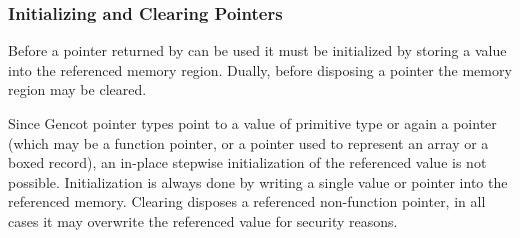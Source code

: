 \subsubsection{Initializing and Clearing Pointers}

Before a pointer returned by  can be used it must be initialized by storing a value into the referenced memory region.
Dually, before disposing a pointer the memory region may be cleared.

Since Gencot pointer types  point to a value of primitive type or again a pointer (which may be a function pointer,
or a pointer used to represent an array or a boxed record), an in-place
stepwise initialization of the referenced value is not possible. Initialization is always done by writing a single value or pointer
into the referenced memory. Clearing disposes a referenced non-function pointer, in all cases it may overwrite the referenced value
for security reasons.


